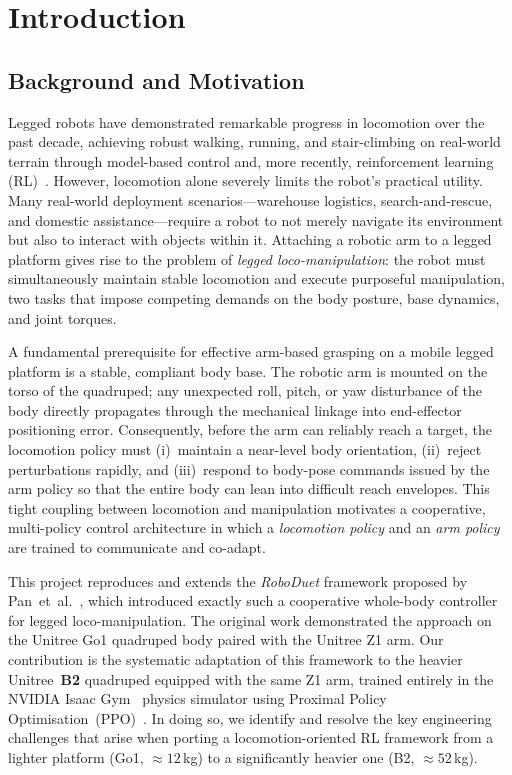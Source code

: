 
\chapter{Introduction} \label{chp:intro}

\section{Background and Motivation}

Legged robots have demonstrated remarkable progress in locomotion over the past decade,
achieving robust walking, running, and stair-climbing on real-world terrain through
model-based control and, more recently, reinforcement learning (RL)~\cite{lee2020learning,kumar2021rma}.
However, locomotion alone severely limits the robot's practical utility.
Many real-world deployment scenarios---warehouse logistics, search-and-rescue, and
domestic assistance---require a robot to not merely navigate its environment but also
to interact with objects within it.
Attaching a robotic arm to a legged platform gives rise to the problem of
\emph{legged loco-manipulation}: the robot must simultaneously maintain stable
locomotion and execute purposeful manipulation, two tasks that impose competing
demands on the body posture, base dynamics, and joint torques.

A fundamental prerequisite for effective arm-based grasping on a mobile legged
platform is a stable, compliant body base.
The robotic arm is mounted on the torso of the quadruped; any unexpected roll,
pitch, or yaw disturbance of the body directly propagates through the mechanical
linkage into end-effector positioning error.
Consequently, before the arm can reliably reach a target, the locomotion policy
must (i)~maintain a near-level body orientation, (ii)~reject perturbations rapidly,
and (iii)~respond to body-pose commands issued by the arm policy so that the
entire body can lean into difficult reach envelopes.
This tight coupling between locomotion and manipulation motivates a cooperative,
multi-policy control architecture in which a \emph{locomotion policy} and an
\emph{arm policy} are trained to communicate and co-adapt.

This project reproduces and extends the \emph{RoboDuet} framework proposed by
Pan~et~al.~\cite{pan2024roboduet}, which introduced exactly such a cooperative
whole-body controller for legged loco-manipulation.
The original work demonstrated the approach on the Unitree Go1 quadruped body
paired with the Unitree Z1 arm.
Our contribution is the systematic adaptation of this framework to the heavier
Unitree~\textbf{B2} quadruped equipped with the same Z1 arm, trained entirely
in the NVIDIA Isaac Gym~\cite{makoviychuk2021isaac} physics simulator using
Proximal Policy Optimisation~(PPO)~\cite{schulman2017proximal}.
In doing so, we identify and resolve the key engineering challenges that arise
when porting a locomotion-oriented RL framework from a lighter platform (Go1,
$\approx\!12$\,kg) to a significantly heavier one (B2, $\approx\!52$\,kg).

